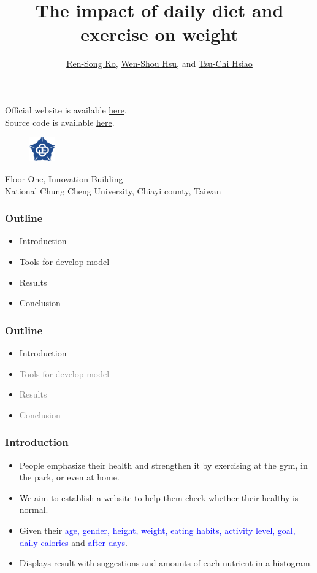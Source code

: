 \documentclass[fleqn]{beamer}
\title{The impact of daily diet and exercise on weight}
\author{\href{mailto: korenson@cs.ccu.edu.tw}{Ren-Song Ko}, \href{mailto: hwshuo111u@cs.ccu.edu.tw}{Wen-Shou Hsu}, and  \href{mailto: stchi111u@cs.ccu.edu.tw}{Tzu-Chi Hsiao}}
\date{}
\begin{document}
\begin{frame}
\titlepage
\begin{center}
Official website is available \href{https://www2.cs.ccu.edu.tw/~stchi111u/project/}{here}. \\
Source code is available \href{https://www2.cs.ccu.edu.tw/~stchi111u/project/下載/index.html}{here}.
\end{center}
\begin{figure}[h]
\centering
\includegraphics[width=0.10\textwidth]{logo.png}
\end{figure}
\begin{center}
Floor One, Innovation Building \\
National Chung Cheng University, Chiayi county, Taiwan
\end{center}
\end{frame}
\begin{frame}
\frametitle{Outline}
\begin{itemize}
\item Introduction \\
\item Tools for develop model \\
\item Results \\
\item Conclusion
\end{itemize}
\end{frame}
\begin{frame}
\frametitle{Outline}
\begin{itemize}
\item Introduction \\
\item \textcolor{gray}{Tools for develop model} \\
\item \textcolor{gray}{Results} \\
\item \textcolor{gray}{Conclusion}
\end{itemize}
\end{frame}
\begin{frame}
\frametitle{Introduction}
\begin{itemize}
\item People emphasize their health and strengthen it by exercising at the gym, in the park, or even at home. \\
\item We aim to establish a website to help them check whether their \alert{healthy} is normal. \\
\item Given their \textcolor{blue}{age, gender, height, weight, eating habits, activity level, goal, daily calories} and \textcolor{blue}{after days}. \\
\item Displays result with suggestions and amounts of each nutrient in a histogram. 
\end{itemize}
\end{frame}
\end{document}
